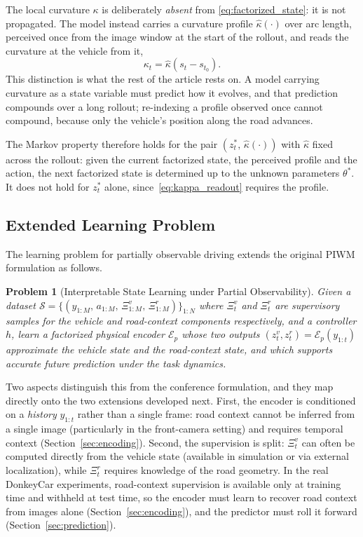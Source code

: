 \documentclass[preprint,12pt]{elsarticle}
\newtheorem{problem}{Problem}
\newcommand{\zv}{z^{v}}      %
\newcommand{\zr}{z^{r}}      %
\newcommand{\zstar}{z^{*}}   %
\begin{document}
The local curvature $\kappa$ is deliberately \emph{absent} from
\eqref{eq:factorized_state}: it is not propagated. The model instead carries a
curvature profile $\hat\kappa(\cdot)$ over arc length, perceived once from the
image window at the start of the rollout, and reads the curvature at the vehicle
from it,
\begin{equation}
    \kappa_t = \hat\kappa\!\left(s_t - s_{t_0}\right).
    \label{eq:kappa_readout}
\end{equation}
This distinction is what the rest of the article rests on. A model carrying
curvature as a state variable must predict how it evolves, and that prediction
compounds over a long rollout; re-indexing a profile observed once cannot compound,
because only the vehicle's position along the road advances.

The Markov property therefore holds for the pair
$\left(\zstar_t,\, \hat\kappa(\cdot)\right)$ with $\hat\kappa$ fixed across the
rollout: given the current factorized state, the perceived profile and the action,
the next factorized state is determined up to the unknown parameters $\theta^*$.
It does not hold for $\zstar_t$ alone, since~\eqref{eq:kappa_readout} requires the
profile.

\subsection{Extended Learning Problem}

The learning problem for partially observable driving extends the original PIWM
formulation as follows.

\begin{problem}[Interpretable State Learning under Partial Observability]
\label{def:po_problem}
Given a dataset
$\mathcal{S} = \{(y_{1:M},\, a_{1:M},\, \Xi^{v}_{1:M},\, \Xi^{r}_{1:M})\}_{1:N}$
where $\Xi^{v}_t$ and $\Xi^{r}_t$ are supervisory samples for the vehicle and
road-context components respectively, and a controller $h$, learn a factorized
physical encoder $\mathcal{E}_p$ whose two outputs
$(\zv_t, \zr_t) = \mathcal{E}_p(y_{1:t})$ approximate the vehicle state and the
road-context state, and which supports accurate future prediction under the task
dynamics.
\end{problem}

Two aspects distinguish this from the conference formulation, and they map
directly onto the two extensions developed next.
First, the encoder is conditioned on a \emph{history} $y_{1:t}$ rather than a
single frame: road context cannot be inferred from a single image (particularly
in the front-camera setting) and requires temporal context
(Section~\ref{sec:encoding}).
Second, the supervision is split: $\Xi^v_t$ can often be computed directly from
the vehicle state (available in simulation or via external localization), while
$\Xi^r_t$ requires knowledge of the road geometry.
In the real DonkeyCar experiments, road-context supervision is available only at
training time and withheld at test time, so the encoder must learn to recover
road context from images alone (Section~\ref{sec:encoding}), and the predictor
must roll it forward (Section~\ref{sec:prediction}).
\end{document}
